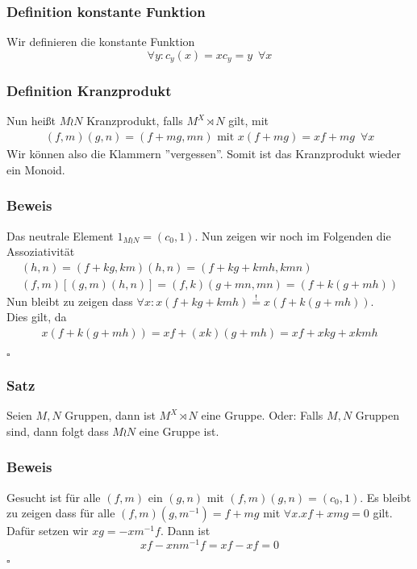 \documentclass[12pt, german]{article}
\newcommand{\bewiesen}{
	
	\begin{flushright}
		$\square$  \\
\end{flushright}}
\begin{document}
	\subsubsection{Definition konstante Funktion}
	Wir definieren die konstante Funktion	$$\forall y:  c_y(x) = xc_y = y \, \, \, \forall x$$ 
	
	\subsubsection{Definition Kranzprodukt}
	Nun heißt $M \wr N$ Kranzprodukt, falls $M^X \rtimes N$ gilt, mit 
	\begin{align*}
		(f,m)(g,n) = (f + mg, mn) \text{ mit } x(f+mg) = xf + mg \, \, \, \forall x
	\end{align*}
	Wir können also die Klammern ''vergessen''. Somit ist das Kranzprodukt wieder ein Monoid.
	
	
	\subsubsection{Beweis}
	Das neutrale Element $1_{M \wr N} = (c_0, 1)$.
	Nun zeigen wir noch im Folgenden die Assoziativität
	\begin{align*}
		[(f,m)(g,m)](h,n) = (f +kg, km)(h,n) = (f +kg + kmh, kmn) \\
		(f,m)[(g,m)(h,n)] = (f,k)(g +mn, mn) = (f + k ( g +mh)) 
	\end{align*}
	Nun bleibt zu zeigen dass $\forall x : x(f+kg + kmh) \overset{!}{=} x(f+k(g+mh))$. \\
	Dies gilt, da 
	\begin{align*}
		x(f+k(g+mh)) = xf+(xk)(g + mh) = xf + xkg + xkmh
	\end{align*}
	\bewiesen
	
	\subsubsection{Satz}
	Seien $M, N$ Gruppen, dann ist $M^X \rtimes N$ eine Gruppe. Oder: Falls $M, N$ Gruppen sind, dann folgt dass  $M \wr N $ eine Gruppe ist.
	
	\subsubsection{Beweis}
	Gesucht ist für alle $(f, m)$ ein $(g,n)$ mit $(f, m)(g,n) = (c_0, 1)$. Es bleibt zu zeigen dass für alle $(f,m)(g, m^{-1}) = f+mg$ mit $\forall x . xf + xmg = 0$ gilt. \\
	Dafür setzen wir $xg = -xm^{-1}f$. Dann ist $$xf-xnm^{-1}f = xf-xf = 0$$	\bewiesen
	
\end{document}
